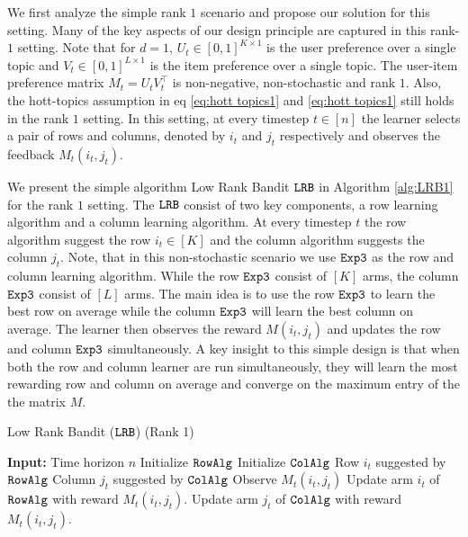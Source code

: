 We first analyze the simple rank $1$ scenario and propose our solution for this setting. Many of the key aspects of our design principle are captured in this rank-$1$ setting. Note that for $d=1$, $U_t\in [0,1]^{K\times 1}$ is the user preference over a single topic and $V_t \in [0,1]^{L\times 1}$ is the item preference over a single topic. The user-item preference matrix $M_t = U_tV_t^{\intercal}$ is non-negative, non-stochastic and rank $1$. Also, the hott-topics assumption in eq \ref{eq:hott topics1} and \ref{eq:hott topics1} still holds in the rank $1$ setting. In this setting, at every timestep $t\in[n]$ the learner selects a pair of rows and columns, denoted by $i_t$ and $j_t$ respectively and observes the feedback $M_t(i_t,j_t)$.

We present the simple algorithm Low Rank Bandit ${\tt LRB}$ in Algorithm \ref{alg:LRB1} for the rank $1$ setting. The ${\tt LRB}$ consist of two key components, a row learning algorithm and a column learning algorithm. At every timestep $t$ the row algorithm suggest the row $i_t\in [K]$ and the column algorithm suggests the column $j_t$. Note, that in this non-stochastic scenario we use ${\tt Exp3}$ as the row and column learning algorithm. While the row ${\tt Exp3}$ consist of $[K]$ arms, the column ${\tt Exp3}$ consist of $[L]$ arms. The main idea is to use the row ${\tt Exp3}$ to learn the best row on average while the column ${\tt Exp3}$ will learn the best column on average. The learner then observes the reward $M(i_t, j_t)$ and updates the row and column ${\tt Exp3}$ simultaneously. A key insight to this simple design is that when both the row and column learner are run simultaneously, they will learn the most rewarding row and column on average and converge on the maximum entry of the the matrix $M$.

\begin{algorithm}[t]
  \caption{Low Rank Bandit (${\tt LRB}$) (Rank 1)}
  \label{alg:LRB1}
  \begin{algorithmic}[1]
    \State \textbf{Input:} Time horizon $n$
      \State Initialize ${\tt RowAlg} $
      \State Initialize ${\tt ColAlg} $
        \State Row $i_t$ suggested by ${\tt RowAlg}$
        \State Column $j_t$ suggested by ${\tt ColAlg}$
        \State Observe $M_t(i_t, j_t)$
    \State Update arm $i_t$ of ${\tt RowAlg}$ with reward $M_t(i_t, j_t)$.
    \State Update arm $j_t$ of ${\tt ColAlg}$ with reward $M_t(i_t, j_t)$.
     \EndFor
  \end{algorithmic}
\end{algorithm}